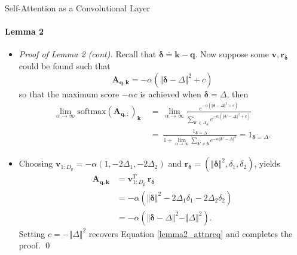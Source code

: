 \documentclass[9pt]{beamer}
\newcommand{\eq}{\ =\ }
\newcommand{\mb}{\bm}
\begin{document}
\newcommand{\sqnorm}[1]{\Vert#1\Vert^2}
\newcommand{\expalpha}[1]{e^{-\alpha#1}}
\newcommand{\limalpha}{\lim_{\alpha\rightarrow\infty}}
\newcommand{\vDelta}{\varDelta}
\begin{frame}{Self-Attention as a Convolutional Layer}
\framesubtitle{Lemma 2}
\begin{itemize}
\item \textit{Proof of Lemma 2 (cont).} Recall that $\bm \delta \doteq \bm k - \bm q$. Now suppose some $\bm v, \bm r_{\bm \delta}$ could be found such that
\begin{equation}
    \mb A_{\mb q, \mb k} = -\alpha(\sqnorm{\bm{\delta - \varDelta}} + c) 
    \label{lemma2_attnreq}
\end{equation}
so that the maximum score $-\alpha c$ is achieved when $\bm\delta = \bm\varDelta$, then
\begin{align*}
    \limalpha \text{softmax}(\mb A_{\mb q, :})_{\mb k} &\eq 
        \limalpha\frac{\expalpha{(\sqnorm{\bm{\delta-\varDelta}}+c)}}{
            \sum_{\bm\delta'\in\Delta_K}
            \expalpha{(\sqnorm{\bm{\delta'-\varDelta}}+c)}
        } \\ &\eq \frac{1_{\bm\delta=\bm\varDelta}}{
            1 + \limalpha\sum_{\bm\delta'\neq \bm\delta}
            \expalpha{\sqnorm{\bm{\delta'-\varDelta}}}
        } = 1_{\bm\delta=\bm\varDelta}.
\end{align*}

\item Choosing $\bm v_{1:D_p} = -\alpha(1, -2\varDelta_1, -2\varDelta_2)$ and $\bm r_{\bm \delta} = (\Vert\bm \delta\Vert^2, \delta_1, \delta_2)$, yields
\begin{align*}
    \mb A_{\mb q, \bm k} &= 
        \mb v_{1:D_p}^T\, \mb r_{\bm \delta}
        \\ &= -\alpha(\sqnorm{\bm\delta} -2\vDelta_1\delta_1-2\vDelta_2\delta_2) 
        \\ &= -\alpha(\sqnorm{\bm\delta-\bm\vDelta} - \sqnorm{\bm\vDelta}).
\end{align*}
Setting $c=-\sqnorm{\bm\varDelta}$ recovers Equation \eqref{lemma2_attnreq} and completes the proof. \qed
\end{itemize}
\end{frame}
\end{document}
